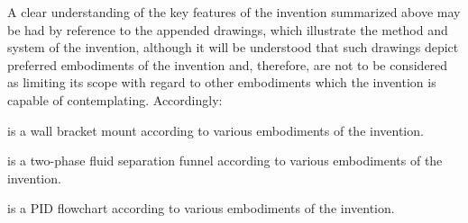
A clear understanding of the key features of the invention summarized above may be had 
by reference to the appended drawings, which illustrate the method and system of the 
invention, although it will be understood that such drawings depict preferred 
embodiments of the invention and, therefore, are not to be considered as limiting its 
scope with regard to other embodiments which the invention is capable of contemplating. 
Accordingly:


 is a wall bracket mount according to various embodiments of the invention.

 is a two-phase fluid separation funnel according to various embodiments of the invention.

 is a PID flowchart according to various embodiments of the invention.

